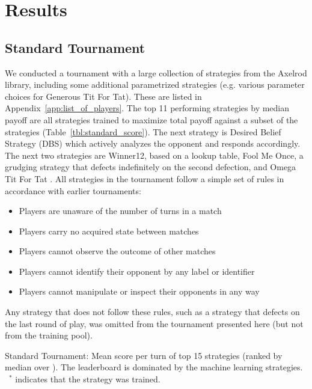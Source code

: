 \documentclass{article}
\begin{document}
\section{Results}

\subsection{Standard Tournament}

We conducted a tournament with a large collection of strategies from the Axelrod
library, including some additional parametrized strategies (e.g. various parameter
choices for Generous Tit For Tat). These are listed in
Appendix~\ref{app:list_of_players}.
The top 11 performing strategies by median payoff are all strategies trained to maximize
total payoff against a subset of the strategies (Table~\ref{tbl:standard_score}).
The next strategy is Desired Belief Strategy (DBS)
which actively analyzes the opponent and responds
accordingly. The next two strategies are Winner12, based on a lookup table,
Fool Me Once, a grudging strategy that defects indefinitely on
the second defection, and Omega Tit For Tat \cite{Slany2007}.
All strategies in the tournament follow a simple set of
rules in accordance with earlier tournaments:

\begin{itemize}
  \item Players are unaware of the number of turns in a match
  \item Players carry no acquired state between matches
  \item Players cannot observe the outcome of other matches
  \item Players cannot identify their opponent by any label or identifier
  \item Players cannot manipulate or inspect their opponents in any way
\end{itemize}

Any strategy that does not follow these rules, such as a strategy that defects
on the last round of play, was omitted from the tournament presented here (but
not from the training pool).

\begin{table}[!hbtp]
        \centering
        
        \caption{Standard Tournament: Mean score per turn of top 15 strategies
            (ranked by median over
        \protecttournaments).
        The leaderboard is dominated by the machine learning strategies. ~$^{*}$
        indicates that the strategy was trained.}
        \label{tbl:standard_score}
\end{table}
\end{document}
